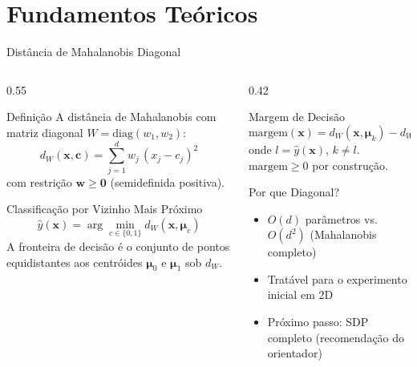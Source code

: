 \documentclass[aspectratio=169, 8pt]{beamer}
\begin{document}
\section{Fundamentos Teóricos}

\begin{frame}{Distância de Mahalanobis Diagonal}
  \begin{columns}[T]
    \begin{column}{0.55\textwidth}
      \begin{block}{Definição}
        A distância de Mahalanobis com matriz diagonal $W = \mathrm{diag}(w_1, w_2)$:
        \[
          d_W(\mathbf{x}, \mathbf{c}) = \sum_{j=1}^{d} w_j \, (x_j - c_j)^2
        \]
        com restrição $\mathbf{w} \geq \mathbf{0}$ (semidefinida positiva).
      \end{block}

      \vspace{0.4em}

      \begin{block}{Classificação por Vizinho Mais Próximo}
        \[
          \hat{y}(\mathbf{x}) = \arg\min_{c \in \{0,1\}} d_W(\mathbf{x}, \boldsymbol{\mu}_c)
        \]
        A fronteira de decisão é o conjunto de pontos equidistantes
        aos centróides $\boldsymbol{\mu}_0$ e $\boldsymbol{\mu}_1$ sob $d_W$.
      \end{block}

     
    \end{column}

    \begin{column}{0.42\textwidth}
      \begin{alertblock}{Margem de Decisão}
        \[
          \mathrm{margem}(\mathbf{x}) = d_W(\mathbf{x}, \boldsymbol{\mu}_k) - d_W(\mathbf{x}, \boldsymbol{\mu}_l)
        \]
        onde $l = \hat{y}(\mathbf{x})$, $k \neq l$.\\
        $\mathrm{margem} \geq 0$ por construção.
      \end{alertblock}

       \vspace{0.4em}

      \begin{exampleblock}{Por que Diagonal?}
        \begin{itemize}
          \item $O(d)$ parâmetros vs.\ $O(d^2)$ (Mahalanobis completo)
          \item Tratável para o experimento inicial em 2D
          \item Próximo passo: SDP completo (recomendação do orientador)
        \end{itemize}
      \end{exampleblock}
    \end{column}
  \end{columns}
\end{frame}
\end{document}

